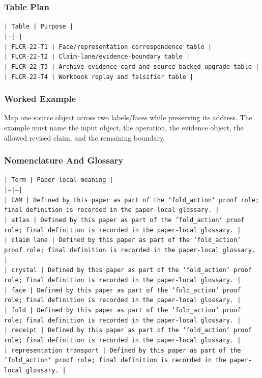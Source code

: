 \documentclass[11pt]{article}
\begin{document}
\subsubsection*{Table Plan}

\noindent\texttt{| Table | Purpose |}\\
\noindent\texttt{|---|---|}\\
\noindent\texttt{| FLCR-22-T1 | Face/representation correspondence table |}\\
\noindent\texttt{| FLCR-22-T2 | Claim-lane/evidence-boundary table |}\\
\noindent\texttt{| FLCR-22-T3 | Archive evidence card and source-backed upgrade table |}\\
\noindent\texttt{| FLCR-22-T4 | Workbook replay and falsifier table |}\\

\subsubsection*{Worked Example}

Map one source object across two labels/faces while preserving its address. The example must name the input object, the operation,
the evidence object, the allowed revised claim, and the remaining boundary.

\subsubsection*{Nomenclature And Glossary}

\noindent\texttt{| Term | Paper-local meaning |}\\
\noindent\texttt{|---|---|}\\
\noindent\texttt{| CAM | Defined by this paper as part of the `fold\_action` proof role; final definition is recorded in the paper-local glossary. |}\\
\noindent\texttt{| atlas | Defined by this paper as part of the `fold\_action` proof role; final definition is recorded in the paper-local glossary. |}\\
\noindent\texttt{| claim lane | Defined by this paper as part of the `fold\_action` proof role; final definition is recorded in the paper-local glossary. |}\\
\noindent\texttt{| crystal | Defined by this paper as part of the `fold\_action` proof role; final definition is recorded in the paper-local glossary. |}\\
\noindent\texttt{| face | Defined by this paper as part of the `fold\_action` proof role; final definition is recorded in the paper-local glossary. |}\\
\noindent\texttt{| fold | Defined by this paper as part of the `fold\_action` proof role; final definition is recorded in the paper-local glossary. |}\\
\noindent\texttt{| receipt | Defined by this paper as part of the `fold\_action` proof role; final definition is recorded in the paper-local glossary. |}\\
\noindent\texttt{| representation transport | Defined by this paper as part of the `fold\_action` proof role; final definition is recorded in the paper-local glossary. |}\\
\end{document}
